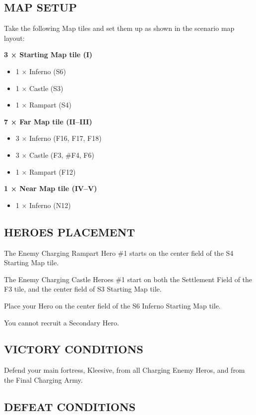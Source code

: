\begin{multicols*}{2}
\subsection*{\MakeUppercase{Map setup}}

Take the following Map tiles and set them up as shown in the scenario map layout:

\textbf{3 × Starting Map tile (I)}
\begin{itemize}
  \item 1 × Inferno (S6)
  \item 1 × Castle (S3)
  \item 1 × Rampart (S4)
\end{itemize}

\textbf{7 × Far Map tile (II--III)}
\begin{itemize}
  \item 3 × Inferno (F16, F17, F18)
  \item 3 × Castle (F3, \#F4, F6)
  \item 1 × Rampart (F12)
\end{itemize}

\textbf{1 × Near Map tile (IV--V)}
\begin{itemize}
  \item 1 × Inferno (N12)
\end{itemize}

\subsection*{\MakeUppercase{Heroes placement}}

The Enemy Charging Rampart Hero \#1 starts on the center field of the S4 Starting Map tile.

The Enemy Charging Castle Heroes \#1 start on both the Settlement Field of the F3 tile, and the center field of S3 Starting Map tile.

Place your Hero on the center field of the S6 Inferno Starting Map tile.

You cannot recruit a Secondary Hero.

\subsection*{\MakeUppercase{Victory Conditions}}

Defend your main fortress, Kleesive, from all Charging Enemy Heros, and from the Final Charging Army.

\subsection*{\MakeUppercase{Defeat Conditions}}


\end{multicols*}
